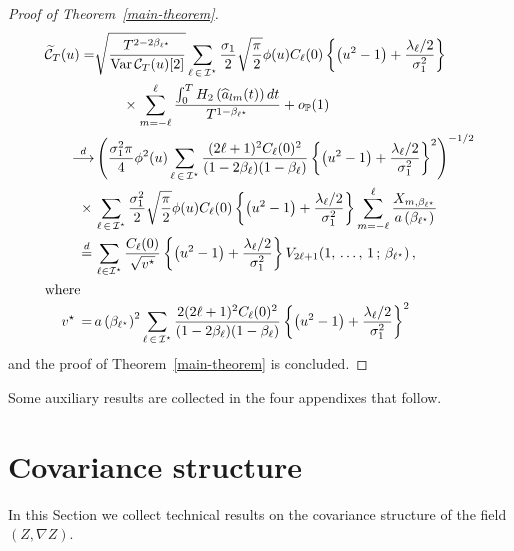 \documentclass[AHL,Unicode,longabstracts,published]{cedram}
\newcommand{\clI}{\mathcal{I}}
\newcommand{\clC}{\mathcal{C}}
\newcommand{\bbP}{\mathbb{P}}
\DeclareMathOperator{\Var}{Var}
\begin{document}
\begin{proof}[Proof of Theorem~\ref{main-theorem}]
\begin{align*}
\widetilde{\clC}_{T}(u)=&\sqrt{\frac{T^{2-2\beta_{\ell^\star}}}{\Var \clC_{T}(u)[2]}} \sum_{\ell\,\in\,\clI^\star} \frac{\sigma_1}{2}\sqrt{\frac\pi2} \phi(u) C_\ell(0) \left\{\left(u^{2}-1\right)+\frac{\lambda _{\ell}/2}{\sigma_{1}^{2}}\right\}\\
&\qquad\times \sum_{m=-\ell}^{\ell} \frac{\int_{0}^T H_2\left(\widehat a_{lm}(t)\right)dt}{T^{1-\beta_{\ell^\star}}}+o_{\bbP}(1)
\\
\mathop{\longrightarrow}^d &\left(\frac{\sigma_{1}^{2}\pi }{4}\phi ^{2}(u)\sum_{\ell\, \in\,\clI^\star} \frac{(2\ell+1)^{2} C_\ell(0)^2}{(1-2\beta_\ell)(1-\beta_\ell)} \left\{ \left(u^{2}-1\right)+\frac{\lambda _{\ell}/2}{\sigma_{1}^{2}}\right\}^2 \right)^{-1/2}
\\
\qquad\times\,&\sum_{\ell\,\in\,\clI^\star} \frac{\sigma_1^2}{2}\sqrt{\frac\pi2} \phi(u) C_\ell(0) \left\{\left(u^{2}-1\right)+\frac{\lambda _{\ell}/2}{\sigma_{1}^{2}}\right\}\sum_{m=-\ell}^{\ell} \frac{X_{m,\beta_{\ell^\star}}}{a\left(\beta_{\ell^\star}\right)}
\\
\mathop{=}^{d}\,&\sum_{\ell \in \clI^\star} \frac{C_\ell(0)}{\sqrt{v^\star}}\left\{\left(u^{2}-1\right)+\frac{\lambda _{\ell}/2}{\sigma_{1}^{2}}\right\}V_{2\ell+1}(1,\,\dots,\,1\,;\,\beta_{\ell^\star})\,,
\\
\intertext{where}
v^\star\,=\,& a\left(\beta_{\ell^\star}\right)^2 \sum_{\ell\, \in\,\clI^\star} \frac{2(2\ell+1)^{2} C_\ell(0)^2}{(1-2\beta_\ell)(1-\beta_\ell)} \left\{ \left(u^{2}-1\right)+\frac{\lambda _{\ell}/2}{\sigma_{1}^{2}}\right\}^2
\end{align*}
and the proof of Theorem~\ref{main-theorem} is concluded.
\end{proof}

Some auxiliary results are collected in the four appendixes that follow.


\appendix

\section{Covariance structure}
\label{app-cov}

In this Section we collect technical results on the covariance structure of the field $(Z, \nabla Z)$.
\end{document}

